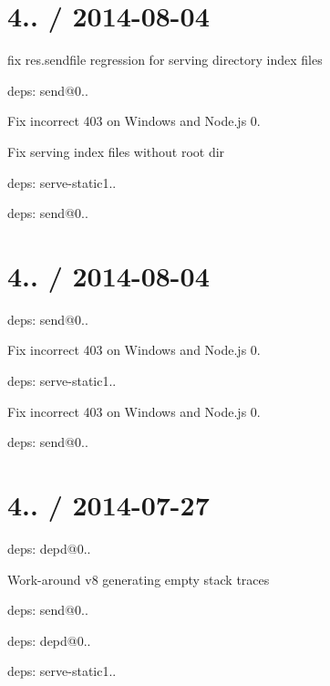 \section*{4.. / 2014-\/08-\/04 }


\begin{DoxyItemize}
\item fix {\ttfamily res.\+sendfile} regression for serving directory index files
\item deps\+: send@0..
\begin{DoxyItemize}
\item Fix incorrect 403 on Windows and Node.\+js 0.
\item Fix serving index files without root dir
\end{DoxyItemize}
\item deps\+: serve-\/static1..
\begin{DoxyItemize}
\item deps\+: send@0..
\end{DoxyItemize}
\end{DoxyItemize}

\section*{4.. / 2014-\/08-\/04 }


\begin{DoxyItemize}
\item deps\+: send@0..
\begin{DoxyItemize}
\item Fix incorrect 403 on Windows and Node.\+js 0.
\end{DoxyItemize}
\item deps\+: serve-\/static1..
\begin{DoxyItemize}
\item Fix incorrect 403 on Windows and Node.\+js 0.
\item deps\+: send@0..
\end{DoxyItemize}
\end{DoxyItemize}

\section*{4.. / 2014-\/07-\/27 }


\begin{DoxyItemize}
\item deps\+: depd@0..
\begin{DoxyItemize}
\item Work-\/around v8 generating empty stack traces
\end{DoxyItemize}
\item deps\+: send@0..
\begin{DoxyItemize}
\item deps\+: depd@0..
\end{DoxyItemize}
\item deps\+: serve-\/static1..
\end{DoxyItemize}

